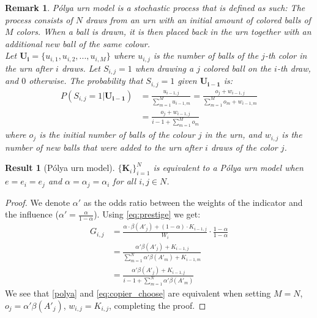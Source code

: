 \documentclass[12pt]{extarticle}
\let\vec\mathbf
\newtheorem{remark}{Remark}
\newtheorem{result}{Result}
\begin{document}
\begin{remark}
\textit{Pólya urn model}  is a stochastic process that is defined as such: 
The process consists of $N$ draws from an urn with an initial amount of colored balls of $M$ colors. When a ball is drawn, it is then placed back in the urn together with an additional new ball of the same colour.\\
Let $\vec{U_i} = \{u_{i,1},u_{i,2},...,u_{i,M}\}$  where $u_{i,j}$ is the number of balls of the $j$-th color in the urn after $i$ draws.
Let $S_{i,j}=1$ when drawing a $j$ colored ball on the $i$-th draw, and $0$ otherwise. The probability that $S_{i,j}=1$ given $\vec{U_{i-1}}$ is:
\begin{equation}\label{polya}
\begin{split}
P(S_{i,j} = 1 | \vec{U_{i-1}}) & = \frac{u_{i-1,j}}{\sum\limits_{m=1}^{M} u_{i-1,m}} = \frac{o_j + w_{i-1,j}}{\sum\limits_{m=1}^{M} o_m + w_{i-1,m}}\\
 & = \frac{o_j + w_{i-1,j}}{i-1 + \sum\limits_{m=1}^{M} o_m}
\end{split}
\end{equation}
where $o_j$ is the initial number of balls of the colour $j$ in the urn, and $w_{i,j}$ is the number of new balls that were added to the urn after $i$ draws of the color $j$.
\end{remark}

\begin{result}[Pólya urn model]
$\big\{\vec{K}_i\big\}_{i=1}^N$ is equivalent to a \textit{Pólya urn model} when $e=e_i=e_j$ and $\alpha=\alpha_j=\alpha_i$ for all $i,j \in N$.
\end{result}

\begin{proof} 
We denote $\alpha'$ as the odds ratio between the weights of the indicator and the influence ($\alpha'=\frac{\alpha}{1-\alpha}$). 
Using \cref{eq:prestige} we get:
\begin{equation}\label{eq:copier_choose}
\begin{split}
G_{i,j} & = \frac{\alpha\cdot \beta(A'_j) + (1-\alpha) \cdot K_{i-1,j}}{W_i} \cdot \frac{1-\alpha}{1-\alpha} \\
&= \frac{\alpha'\beta(A'_j) + K_{i-1,j}}{\sum\limits_{m=1}^{N} \alpha'\beta(A'_m) + K_{i-1,m}}\\
& =\frac{\alpha'\beta(A'_j) + K_{i-1,j}}{i-1 + \sum\limits_{m=1}^{N} \alpha'\beta(A'_m)}
\end{split}
\end{equation}
We see that \cref{polya} and \cref{eq:copier_choose} are equivalent when setting $M=N$, $o_j = \alpha'\beta(A'_j)$, $w_{i,j} = K_{i,j}$, completing the proof.
\end{proof} 
\end{document}
